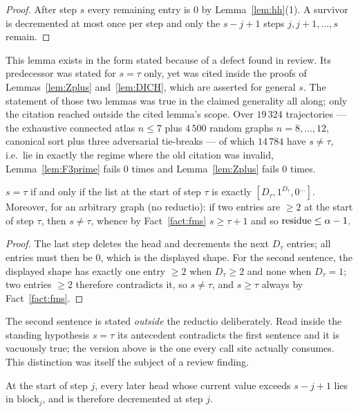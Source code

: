 \begin{proof}
After step $s$ every remaining entry is $0$ by Lemma~\ref{lem:hh}(1). A survivor is
decremented at most once per step and only the $s - j + 1$ steps $j, j+1, \dots, s$ remain.
\end{proof}

This lemma exists in the form stated because of a defect found in review. Its predecessor
was stated for $s = \tau$ only, yet was cited inside the proofs of
Lemmas~\ref{lem:Zplus} and~\ref{lem:DICH}, which are asserted for general $s$. The
statement of those two lemmas was true in the claimed generality all along; only the
citation reached outside the cited lemma's scope. Over $19\,324$ trajectories --- the
exhaustive connected atlas $n \le 7$ plus $4\,500$ random graphs $n = 8,\dots,12$, canonical
sort plus three adversarial tie-breaks --- of which $14\,784$ have $s \ne \tau$, i.e.\ lie
in exactly the regime where the old citation was invalid, Lemma~\ref{lem:F3prime} fails $0$
times and Lemma~\ref{lem:Zplus} fails $0$ times.

\begin{lemma}\label{lem:T}
\Selem
$s = \tau$ if and only if the list at the start of step $\tau$ is exactly
$[D_\tau, 1^{D_\tau}, 0^{\dots}]$. Moreover, for an arbitrary graph
\textup{(}no reductio\textup{)}: if two entries are $\ge 2$ at the start of step $\tau$,
then $s \ne \tau$, whence by Fact~\ref{fact:fms} $s \ge \tau+1$ and so
$\operatorname{residue} \le \alpha - 1$.
\end{lemma}

\begin{proof}
The last step deletes the head and decrements the next $D_\tau$ entries; all entries must
then be $0$, which is the displayed shape. For the second sentence, the displayed shape has
exactly one entry $\ge 2$ when $D_\tau \ge 2$ and none when $D_\tau = 1$; two entries $\ge
2$ therefore contradicts it, so $s \ne \tau$, and $s \ge \tau$ always by
Fact~\ref{fact:fms}.
\end{proof}

The second sentence is stated \emph{outside} the reductio deliberately. Read inside the
standing hypothesis $s = \tau$ its antecedent contradicts the first sentence and it is
vacuously true; the version above is the one every call site actually consumes. This
distinction was itself the subject of a review finding.

\begin{lemma}\label{lem:Zplus}
At the start of step $j$, every later head whose current value exceeds $s - j + 1$ lies in
$\mathrm{block}_j$, and is therefore decremented at step $j$.
\end{lemma}

